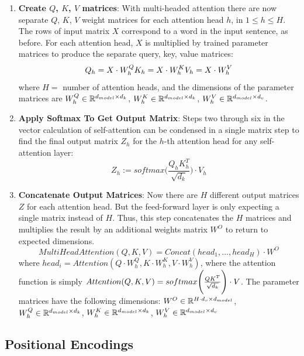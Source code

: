 \begin{enumerate}
    \item \textbf{Create $Q$, $K$, $V$ matrices}: With multi-headed attention there are now separate $Q$, $K$, $V$ weight matrices for each attention head $h$, in $1 \leq h \leq H$. The rows of input matrix $X$ correspond to a word in the input sentence, as before. For each attention head, $X$ is multiplied by trained parameter matrices to produce the separate query, key, value matrices: 
    $$
    Q_h = X \cdot W_h^Q \\
    K_h = X \cdot W_h^K \\
    V_h = X \cdot W_h^V 
    $$
    where $H =$ number of attention heads, and the dimensions of the parameter matrices are $\large W_h^Q \in \mathbb{R}^{\Large d_{model} \times d_k}$, $\large W_h^K \in \mathbb{R}^{\Large d_{model} \times d_k}$, $\large W_h^V \in \mathbb{R}^{\Large d_{model} \times d_v}$. 
    
    \item \textbf{Apply Softmax To Get Output Matrix}: Steps two through six in the vector calculation of self-attention can be condensed in a single matrix step to find the final output matrix $Z_h$ for the $h$-th attention head for any self-attention layer:
    $$
    Z_h := softmax \Bigg(\frac {Q_h K_h^T} {\sqrt{d_k}} \Bigg) \cdot V_h
    $$
    
    \item \textbf{Concatenate Output Matrices}: Now there are $H$ different output matrices $Z$ for each attention head. But the feed-forward layer is only expecting a single matrix instead of $H$. Thus, this step concatenates the $H$ matrices and multiplies the result by an additional weights matrix $W^O$ to return to expected dimensions. 
    $$
    MultiHeadAttention(Q, K, V) = Concat(head_1, ..., head_H) \cdot W^O
    $$
      where $head_i = Attention(Q \cdot W_h^Q, K \cdot W_h^K, V \cdot W_h^V)$, where the attention function is simply $Attention(Q, K, V) = softmax \Bigg( \frac {\Large QK^T} {\Large \sqrt{d_k}} \Bigg) \cdot V$. The parameter matrices have the following dimensions:  $W^O \in \mathbb{R}^{\Large H \cdot d_v \times d_{model}}$, $\large W_h^Q \in \mathbb{R}^{\Large d_{model} \times d_k}$, $\large W_h^K \in \mathbb{R}^{\Large d_{model} \times d_k}$, $\large W_h^V \in \mathbb{R}^{\Large d_{model} \times d_v}$
    
    
\end{enumerate}



\subsection{Positional Encodings} \label{sec:PosEncodings}

